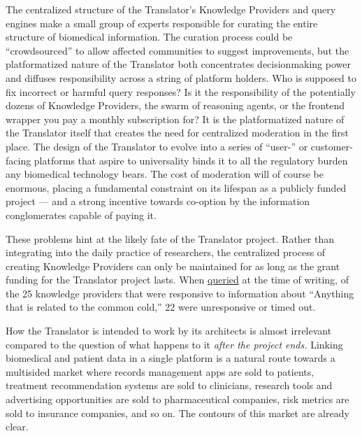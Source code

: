 \documentclass{article}
\begin{document}
The centralized structure of the Translator's Knowledge Providers and
query engines make a small group of experts responsible for curating the
entire structure of biomedical information. The curation process could
be ``crowdsourced'' to allow affected communities to suggest
improvements, but the platformatized nature of the Translator both
concentrates decisionmaking power and diffuses responsibility across a
string of platform holders. Who is supposed to fix incorrect or harmful
query responses? Is it the responsibility of the potentially dozens of
Knowledge Providers, the swarm of reasoning agents, or the frontend
wrapper you pay a monthly subscription for? It is the platformatized
nature of the Translator itself that creates the need for centralized
moderation in the first place. The design of the Translator to evolve
into a series of ``user-'' or customer-facing platforms that aspire to
universality binds it to all the regulatory burden any biomedical
technology bears. The cost of moderation will of course be enormous,
placing a fundamental constraint on its lifespan as a publicly funded
project --- and a strong incentive towards co-option by the information
conglomerates capable of paying it.

These problems hint at the likely fate of the Translator project. Rather
than integrating into the daily practice of researchers, the centralized
process of creating Knowledge Providers can only be maintained for as
long as the grant funding for the Translator project lasts. When
\href{https://arax.rtx.ai}{queried} at the time of writing, of the 25
knowledge providers that were responsive to information about ``Anything
that is related to the common cold,'' 22 were unresponsive or timed out.

How the Translator is intended to work by its architects is almost
irrelevant compared to the question of what happens to it \emph{after
the project ends.} Linking biomedical and patient data in a single
platform is a natural route towards a multisided market where records
management apps are sold to patients, treatment recommendation systems
are sold to clinicians, research tools and advertising opportunities are
sold to pharmaceutical companies, risk metrics are sold to insurance
companies, and so on. The contours of this market are already clear.
\end{document}
